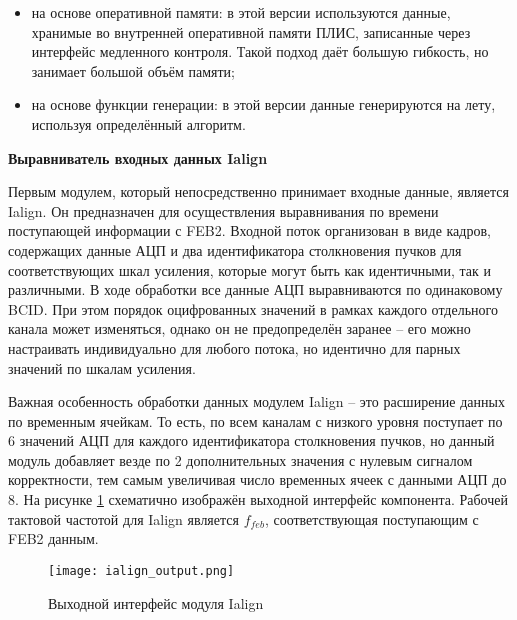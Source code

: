 \begin{itemize}
    \item на основе оперативной памяти: в этой версии используются данные, хранимые во внутренней оперативной памяти ПЛИС, записанные через интерфейс медленного контроля. Такой подход даёт большую гибкость, но занимает большой объём памяти;
    \item на основе функции генерации: в этой версии данные генерируются на лету, используя определённый алгоритм.
\end{itemize}\par
\textbf{Выравниватель входных данных Ialign}\par
Первым модулем, который непосредственно принимает входные данные, является Ialign. Он предназначен для осуществления выравнивания по времени поступающей информации с FEB2. Входной поток организован в виде кадров, содержащих данные АЦП и два идентификатора столкновения пучков для соответствующих шкал усиления, которые могут быть как идентичными, так и различными. В ходе обработки все данные АЦП выравниваются по одинаковому BCID. При этом порядок оцифрованных значений в рамках каждого отдельного канала может изменяться, однако он не предопределён заранее -- его можно настраивать индивидуально для любого потока, но идентично для парных значений по шкалам усиления.\par
Важная особенность обработки данных модулем Ialign -- это расширение данных по временным ячейкам. То есть, по всем каналам с низкого уровня поступает по 6 значений АЦП для каждого идентификатора столкновения пучков, но данный модуль добавляет везде по 2 дополнительных значения с нулевым сигналом корректности, тем самым увеличивая число временных ячеек с данными АЦП до 8. На рисунке \ref{fig:ialign_output} схематично изображён выходной интерфейс компонента. Рабочей тактовой частотой для Ialign является $f_{feb}$, соответствующая поступающим с FEB2 данным.

\begin{figure}[ht]
    \centering
    \texttt{[image: ialign\_output.png]}
    \caption{Выходной интерфейс модуля Ialign}
    \label{fig:ialign_output}
\end{figure}\par

